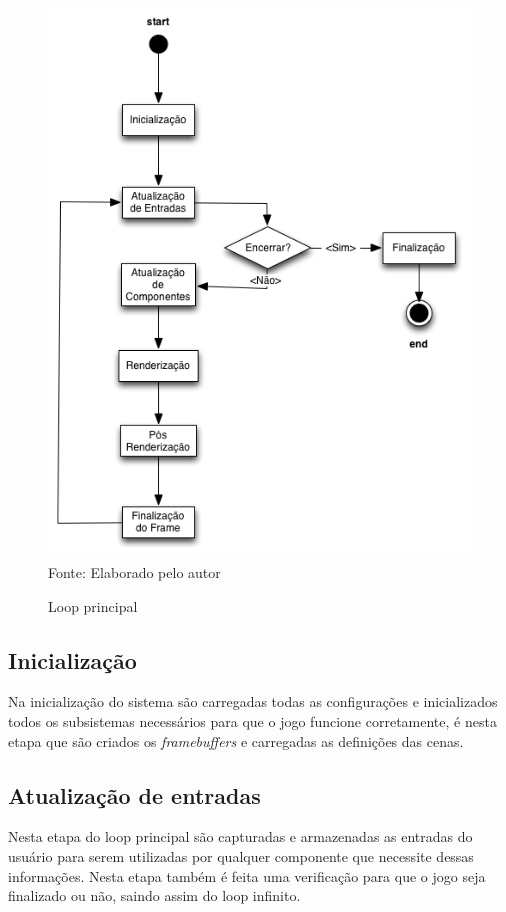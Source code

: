 \documentclass[12pt,	openright, twoside,	a4paper, english, french, spanish, brazil]{abntex2}
\begin{document}
\begin{figure}[H]
\centering
\caption{Loop principal}
\includegraphics[width=12cm]{imagens/gameloop.png}
\\
\small{Fonte: Elaborado pelo autor}
\label{figura:gameloop}
\end{figure}

\subsection{Inicialização}
Na inicialização do sistema são carregadas todas as configurações e inicializados todos os subsistemas necessários para que o jogo funcione corretamente, é nesta etapa que são criados os \textit{framebuffers} e carregadas as definições das cenas.

\subsection{Atualização de entradas}
Nesta etapa do loop principal são capturadas e armazenadas as entradas do usuário para serem utilizadas por qualquer componente que necessite dessas informações. Nesta etapa também é feita uma verificação para que o jogo seja finalizado ou não, saindo assim do loop infinito.
\end{document}
